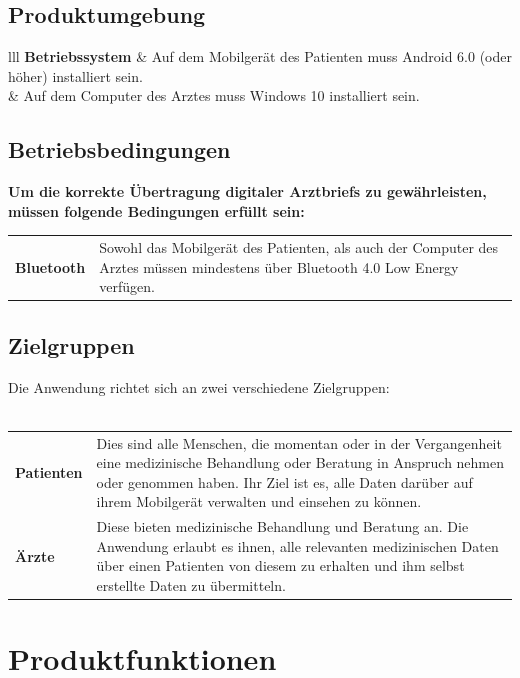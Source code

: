 \documentclass[a4paper]{scrreprt}
\begin{document}
\section{Produktumgebung}
\begin{tabular}{lll}
\textbf{{Betriebssystem}} &   {Auf dem Mobilgerät des Patienten muss Android 6.0 (oder höher) installiert sein.}\\
{} &  {Auf dem Computer des Arztes muss Windows 10 installiert sein.} \\
\end{tabular} 

\section{Betriebsbedingungen}
{\textbf{Um die korrekte Übertragung digitaler \glspl{Arztbrief} zu gewährleisten, müssen folgende Bedingungen erfüllt sein:}} \newline\newline
\begin{tabular}{lll}
\textbf{\gls{Bluetooth}} & \multicolumn{2}{p{11.5cm}}{Sowohl das Mobilgerät des Patienten, als auch der Computer des Arztes müssen mindestens über \gls{Bluetooth} 4.0 Low Energy verfügen.} \\
\end{tabular} 
 
\section{Zielgruppen}
Die Anwendung richtet sich an zwei verschiedene Zielgruppen:  \\\\
\begin{tabular}{lll}
\textbf{Patienten} &  \multicolumn{2}{p{12cm}}{Dies sind alle Menschen, die momentan oder in der Vergangenheit eine medizinische Behandlung oder Beratung in Anspruch nehmen oder genommen haben. Ihr Ziel ist es, alle Daten darüber auf ihrem Mobilgerät verwalten und einsehen zu können.}\\
\textbf{Ärzte} &  \multicolumn{2}{p{12cm}}{Diese bieten medizinische Behandlung und Beratung an. Die Anwendung erlaubt es ihnen, alle relevanten medizinischen Daten über einen Patienten von diesem zu erhalten und ihm selbst erstellte Daten zu übermitteln.}  \\
\end{tabular}

\chapter{Produktfunktionen}
\end{document}
